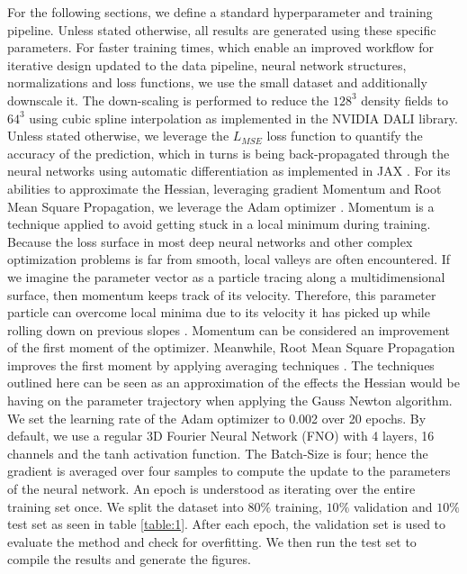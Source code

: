 \documentclass{article}
\begin{document}
For the following sections, we define a standard hyperparameter and training pipeline. Unless stated otherwise, all results are generated using these specific parameters. For faster training times, which enable an improved workflow for iterative design updated to the data pipeline, neural network structures, normalizations and loss functions, we use the small dataset and additionally downscale it. The down-scaling is performed to reduce the $128^3$ density fields to $64^3$ using cubic spline interpolation as implemented in the NVIDIA DALI library. Unless stated otherwise, we leverage the $L_{MSE}$ loss function to quantify the accuracy of the prediction, which in turns is being back-propagated through the neural networks using automatic differentiation as implemented in {JAX} \citep{jax2018github}.  For its abilities to approximate the Hessian, leveraging gradient Momentum and Root Mean Square Propagation, we leverage the Adam optimizer \citep{kingma2014adam}. Momentum is a technique  applied to avoid getting stuck in a local minimum during training. Because the loss surface in most deep neural networks and other complex optimization problems is far from smooth, local valleys are often encountered. If we imagine the parameter vector as a particle tracing along a multidimensional surface, then momentum keeps track of its velocity. Therefore, this parameter particle can overcome local minima due to its velocity it has picked up while rolling down on previous slopes \citep{qian1999momentum}. Momentum can be considered an improvement of the first moment of the optimizer. Meanwhile, Root Mean Square Propagation improves the first moment by applying averaging techniques \citep{kingma2014adam}. The techniques outlined here can be seen as an approximation of the effects the Hessian would be having on the parameter trajectory when applying the Gauss Newton algorithm. We set the learning rate of the Adam optimizer to 0.002 over 20 epochs. By default, we use a regular 3D Fourier Neural Network (FNO) with 4 layers, 16 channels and the tanh activation function. The Batch-Size is four; hence the gradient is averaged over four samples to compute the update to the parameters of the neural network. An epoch is understood as iterating over the entire training set once. We split the dataset into $80\%$ training, $10\%$ validation and $10\%$ test set as seen in table \ref{table:1}. After each epoch, the validation set is used to evaluate the method and check for overfitting. We then run the test set to compile the results and generate the figures.
\end{document}
